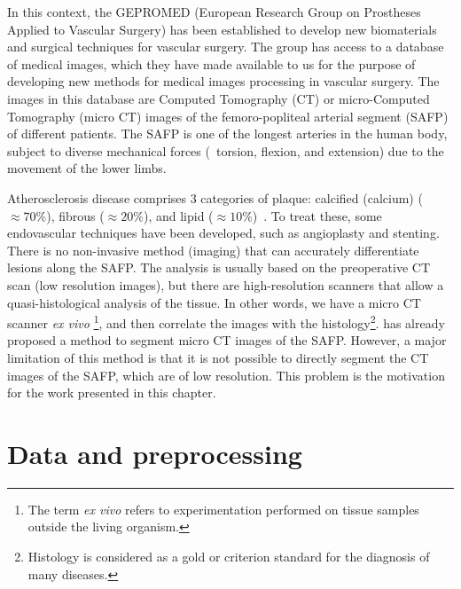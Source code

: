 In this context, the GEPROMED (European Research Group on Prostheses Applied to Vascular Surgery)
has been established to develop new biomaterials and surgical techniques for
vascular surgery. The group has access to a database of medical images, which
they have made available to us for the purpose of developing new methods for
medical images processing in vascular surgery.
The images in this database  are Computed Tomography (CT) or
micro-Computed Tomography (micro CT) images of the femoro-popliteal arterial
segment (SAFP) of different patients. 
The SAFP is one of the longest arteries in
the human body, subject to diverse mechanical forces 
(\eg~torsion, flexion, and extension) due to the movement of the
lower limbs. 

Atherosclerosis disease comprises 3 categories of plaque: calcified (calcium)
($\approx  70\%$), fibrous ($\approx 20\%$), and lipid 
($\approx 10\%$)~\citep{kuntz2021co}. 
To treat these, some endovascular techniques have been
developed, such as angioplasty and stenting.
There is no non-invasive method (imaging) that can accurately differentiate
lesions along the SAFP. The analysis is usually based on the preoperative CT scan 
(low resolution images), but
there are high-resolution scanners that allow a quasi-histological analysis of
the tissue. In other words, we have a micro CT scanner 
\textit{ex vivo} \footnote{The term \textit{ex vivo} refers to experimentation 
performed 
on tissue samples outside the living organism.}, 
and then correlate the images with the histology\footnote{
Histology is considered as a gold or criterion standard 
for the diagnosis of many diseases.}.
\cite{gangloff2020probabilistic} has already proposed a method to segment
micro CT images of the SAFP. 
However, a major limitation of this method is that it is not possible to directly
segment the CT images of the SAFP, which are of low resolution.
This problem is the motivation for the work presented in this chapter.

\section{Data and preprocessing}

